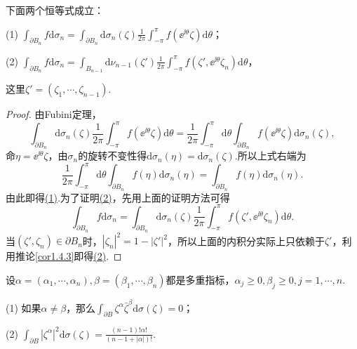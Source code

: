 \begin{theorem}\label{thm1.4.4}
	下面两个恒等式成立：
	
		(1) \hypertarget{1.4.4}{}
		$\int_{\partial B_n}f\mathrm{d}\sigma_n=\int_{\partial B_n}\mathrm{d}\sigma_n(\zeta)\frac1{2\pi}\int_{-\pi}^{\pi}f(\ee^{\ii\theta}\zeta)\mathrm{d}\theta$；
		
		(2) \hypertarget{1.4.4}{}
		$\int_{\partial B_n}f\mathrm{d}\sigma_n=\int_{B_{n-1}}\mathrm{d}\nu_{n-1}(\zeta')\frac1{2\pi}\int_{-\pi}^{\pi} f(\zeta',\ee^{\ii\theta}\zeta_n)\mathrm{d}\theta$，

        这里$\zeta'=(\zeta_1,\cdots,\zeta_{n-1})$.
\end{theorem}
\begin{proof}
	由Fubini定理，
	\[\int_{\partial B_n}\mathrm{d}\sigma_n(\zeta)\frac1{2\pi}\int_{-\pi}^{\pi} f(\ee^{\ii\theta}\zeta)\mathrm{d}\theta=\frac1{2\pi}\int_{-\pi}^{\pi}\mathrm{d}\theta\int_{\partial B_n}f(\ee^{\ii\theta}\zeta)\mathrm{d}\sigma_n(\zeta),\]
	命$\eta=\ee^{\ii\theta}\zeta$，由$\sigma_n$的旋转不变性得$\mathrm{d}\sigma_n(\eta)=\mathrm{d}\sigma_n(\zeta).$所以上式右端为
	\[\frac1{2\pi}\int_{-\pi}^{\pi}\mathrm{d}\theta\int_{\partial B_n}f(\eta)\mathrm{d}\sigma_n(\eta)=\int_{\partial B_n}f(\eta)\mathrm{d}\sigma_n(\eta).\]
	由此即得\hyperlink{1.4.4}{(1)}.为了证明\hyperlink{1.4.4}{(2)}，先用上面的证明方法可得
	\[\int_{\partial B_n}f\mathrm{d}\sigma_n=\int_{\partial B_n}\mathrm{d}\sigma_n(\zeta)\frac1{2\pi}\int_{-\pi}^{\pi} f(\zeta',\ee^{\ii\theta}\zeta_n)\mathrm{d}\theta.\]
	当$(\zeta',\zeta_n)\in\partial B_n$时，$|\zeta_n|^2=1-|\zeta'|^2$，所以上面的内积分实际上只依赖于$\zeta'$，利用推论\ref{cor1.4.3}即得\hyperlink{1.4.4}{(2)}.
\end{proof}
\begin{theorem}\label{thm1.4.5}
	设$\alpha=(\alpha_1,\cdots,\alpha_n),\beta=(\beta_1,\cdots,\beta_n)$都是多重指标，$\alpha_j\ge0,\beta_j\ge0,j=1,\cdots,n$.

		(1) \hypertarget{1.4.5}{} 如果$\alpha\neq\beta$，那么$\int_{\partial B}\zeta^\alpha\bar{\zeta}^\beta\mathrm{d}\sigma(\zeta)=0$；
		
		(2) \hypertarget{1.4.5}{}
		$\int_{\partial B}|\zeta^\alpha|^2\mathrm{d}\sigma(\zeta)=\frac{(n-1)!\alpha!}{(n-1+|\alpha|)!}.$

\end{theorem}
